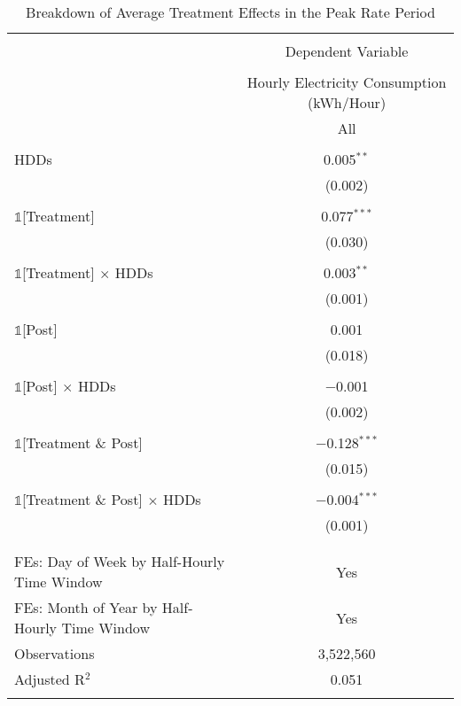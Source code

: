 
\begin{table}[!htbp] \centering 
  \caption{Breakdown of Average Treatment Effects in the Peak Rate Period} 
  \label{Table:Breakdown-of-Average-Treatment-Effects-in-the-Peak-Rate-Period_For-Each-Tariff} 
\small 
\begin{tabular}{@{\extracolsep{20pt}}lc} 
\\[-1.8ex]\hline 
\hline \\[-1.8ex] 
 & \multicolumn{1}{c}{Dependent Variable} \\ 
\cline{2-2} 
\\[-1.8ex] & Hourly Electricity Consumption  (kWh/Hour) \\ 
 & All \\ 
\hline \\[-1.8ex] 
 HDDs & 0.005$^{**}$ \\ 
  & (0.002) \\ 
  & \\ 
 $\mathbb{1}$[Treatment] & 0.077$^{***}$ \\ 
  & (0.030) \\ 
  & \\ 
 $\mathbb{1}$[Treatment] $\times$ HDDs & 0.003$^{**}$ \\ 
  & (0.001) \\ 
  & \\ 
 $\mathbb{1}$[Post] & 0.001 \\ 
  & (0.018) \\ 
  & \\ 
 $\mathbb{1}$[Post] $\times$ HDDs & $-$0.001 \\ 
  & (0.002) \\ 
  & \\ 
 $\mathbb{1}$[Treatment \& Post] & $-$0.128$^{***}$ \\ 
  & (0.015) \\ 
  & \\ 
 $\mathbb{1}$[Treatment \& Post] $\times$ HDDs & $-$0.004$^{***}$ \\ 
  & (0.001) \\ 
  & \\ 
\hline \\[-1.8ex] 
FEs: Day of Week by Half-Hourly Time Window & Yes \\ 
FEs: Month of Year by Half-Hourly Time Window & Yes \\ 
Observations & 3,522,560 \\ 
Adjusted R$^{2}$ & 0.051 \\ 
\hline 
\hline \\[-1.8ex] 
\end{tabular} 
\end{table} 
